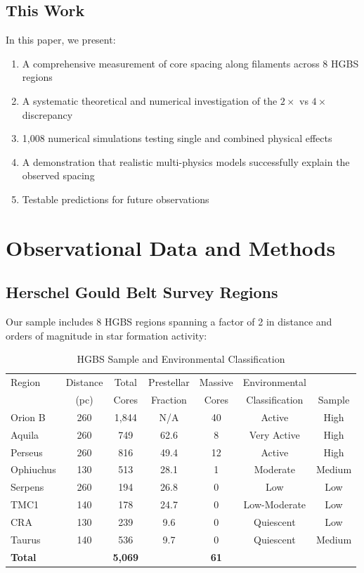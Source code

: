 \documentclass[11pt,a4paper]{article}
\begin{document}
\subsection{This Work}

In this paper, we present:
\begin{enumerate}
    \item A comprehensive measurement of core spacing along filaments across 8 HGBS regions
    \item A systematic theoretical and numerical investigation of the $2\times$ vs $4\times$ discrepancy
    \item 1,008 numerical simulations testing single and combined physical effects
    \item A demonstration that realistic multi-physics models successfully explain the observed spacing
    \item Testable predictions for future observations
\end{enumerate}

\section{Observational Data and Methods}

\subsection{Herschel Gould Belt Survey Regions}

Our sample includes 8 HGBS regions spanning a factor of 2 in distance and orders of magnitude in star formation activity:

\begin{table}[H]
\centering
\caption{HGBS Sample and Environmental Classification}
\begin{tabular}{lcccccc}
\toprule
Region & Distance & Total & Prestellar & Massive & Environmental & \\
       & (pc)   & Cores & Fraction & Cores & Classification & Sample \\
\midrule
Orion B  & 260     & 1,844 & N/A    & 40    & Active      & High   \\
Aquila   & 260     & 749   & 62.6   & 8     & Very Active & High   \\
Perseus  & 260     & 816   & 49.4   & 12    & Active      & High   \\
Ophiuchus& 130     & 513   & 28.1   & 1     & Moderate    & Medium \\
Serpens  & 260     & 194   & 26.8   & 0     & Low         & Low    \\
TMC1     & 140     & 178   & 24.7   & 0     & Low-Moderate & Low    \\
CRA      & 130     & 239   & 9.6    & 0     & Quiescent   & Low    \\
Taurus   & 140     & 536   & 9.7    & 0     & Quiescent   & Medium \\
\midrule
\textbf{Total} &        & \textbf{5,069} &        & \textbf{61} &            &        \\
\bottomrule
\end{tabular}
\end{table}
\end{document}
